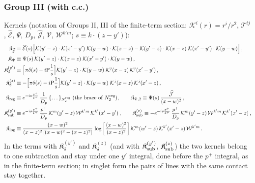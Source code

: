 \documentclass[10pt]{article}
\begin{document}
\subsubsection{Group III (with c.c.)}
\noindent Kernels (notation of Groups II, III of the finite-term section: $\mathcal{K}^{i}(r)=r^{i}/r^{2}$, $\mathcal{T}^{ij}$, $\widehat{\mathcal{E}}$, $\Psi$, $D_{p}$, $\widehat{\mathcal{J}}$, $\mathcal{V}$, $\mathcal{W}^{k'm}$; $s\equiv k\cdot(z-y')$):
\begin{align}
\mathfrak{K}_{\widehat{\mathcal{E}}}&\equiv\widehat{\mathcal{E}}(s)\Big[\mathcal{K}(y'-z)\cdot\mathcal{K}(x'-y')\;\mathcal{K}(y-w)\cdot\mathcal{K}(x-z)-\mathcal{K}(y'-z)\cdot\mathcal{K}(x-z)\;\mathcal{K}(x'-y')\cdot\mathcal{K}(y-w)\Big]\,,\notag\\
\mathfrak{K}_{\Psi}&\equiv\Psi(s)\,\mathcal{K}(y'-z)\cdot\mathcal{K}(x-z)\;\mathcal{K}(x'-y')\cdot\mathcal{K}(y-w)\,,\notag\\
\mathfrak{K}_{\delta}^{(y')}&\equiv\Big[\pi\delta(s)-i{\rm P}\frac{1}{s}\Big]\mathcal{K}(y'-z)\cdot\mathcal{K}(y-w)\;\mathcal{K}^{j}(x-z)\,\mathcal{K}^{j}(x'-y')\,,\notag\\
\mathfrak{K}_{\delta}^{(z)}&\equiv-\Big[\pi\delta(s)-i{\rm P}\frac{1}{s}\Big]\mathcal{K}(y'-z)\cdot\mathcal{K}(y-w)\;\mathcal{K}^{j}(x-z)\,\mathcal{K}^{j}(x'-z)\,,\notag\\
\mathfrak{K}_{\rm reg}&\equiv e^{-is\frac{p^{+}}{k^{+}}}\,\frac{1}{D_{p}}\,\{\dots\}_{N_{2}^{\rm reg}}\ \text{(the brace of $N_{2}^{\rm reg}$)},\qquad
\mathfrak{K}_{\Psi,2}\equiv\Psi(s)\,\frac{\widehat{\mathcal{J}}}{(x-w)^{2}}\,,\notag\\
\mathfrak{K}_{\rm sub}^{(y')}&\equiv e^{-is\frac{p^{+}}{k^{+}}}\,\frac{p^{+}}{D_{p}}\,\mathcal{K}^{m}(y'-z)\,\mathcal{W}^{k'm}\,\mathcal{K}^{k'}(x'-y')\,,\qquad
\mathfrak{K}_{\rm sub}^{(z)}\equiv-e^{-is\frac{p^{+}}{k^{+}}}\,\frac{p^{+}}{D_{p}}\,\mathcal{K}^{m}(y'-z)\,\mathcal{W}^{k'm}\,\mathcal{K}^{k'}(x'-z)\,,\notag\\
\mathfrak{K}_{\log}&\equiv\frac{(x-w)^{2}}{(x-z)^{2}\left[(x-w)^{2}-(x-z)^{2}\right]}\,\log\left[\frac{(x-w)^{2}}{(x-z)^{2}}\right]\mathcal{K}^{m}(w'-z)\,\mathcal{K}^{k'}(x'-z)\,\mathcal{W}^{k'm}\,.\notag
\end{align}
In the terms with $\mathfrak{K}_{\delta}^{(y')}$ and $\mathfrak{K}_{\delta}^{(z)}$ (and with $\mathfrak{K}_{\rm sub}^{(y')}$, $\mathfrak{K}_{\rm sub}^{(z)}$) the two kernels belong to one subtraction and stay under one $y'$ integral, done before the $p^{+}$ integral, as in the finite-term section; in singlet form the pairs of lines with the same contact stay together.
\end{document}

